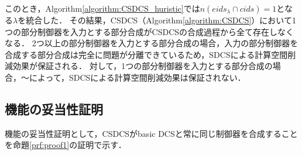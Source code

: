 {\color{red}
このとき，Algorithm\ref{algorithm:CSDCS_huristic}では$n(eids_{\lambda} \cap cids) = 1$となる$\lambda$を統合した．
その結果，CSDCS（Algorithm\ref{algorithm:CSDCS}）において1つの部分制御器を入力とする部分合成がCSDCSの合成過程から全て存在しなくなる．
2つ以上の部分制御器を入力とする部分合成の場合，入力の部分制御器を合成する部分合成は完全に問題が分離できているため，SDCSによる計算空間削減効果が保証される．
対して，1つの部分制御器を入力とする部分合成の場合，〜によって，SDCSによる計算空間削減効果は保証されない．
}

\subsection{機能の妥当性証明}
機能の妥当性証明として，CSDCSがbasic DCSと常に同じ制御器を合成することを命題\ref{prf:proof1}の証明で示す．

